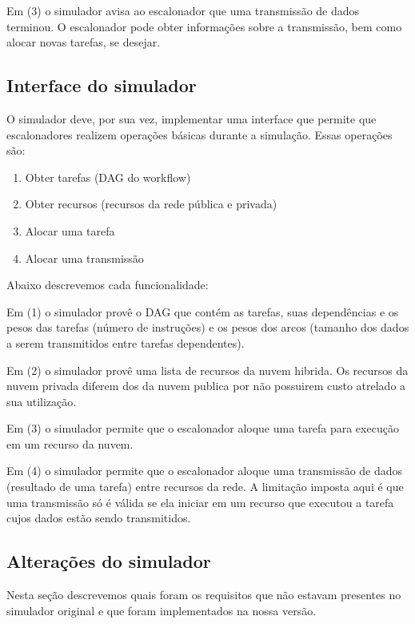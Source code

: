 \documentclass[a4paper,10pt]{article}
\begin{document}
Em (3) o simulador avisa ao escalonador que uma transmissão de dados terminou.
O escalonador pode obter informações sobre a transmissão, bem como alocar novas tarefas, se desejar.

\subsection{Interface do simulador}

O simulador deve, por sua vez, implementar uma interface que permite que escalonadores
realizem operações básicas durante a simulação. Essas operações são:

\begin{enumerate}

  \item Obter tarefas (DAG do workflow)
  \item Obter recursos (recursos da rede pública e privada)
  \item Alocar uma tarefa
  \item Alocar uma transmissão

\end{enumerate}

Abaixo descrevemos cada funcionalidade:

Em (1) o simulador provê o DAG que contém as tarefas, suas dependências e os pesos das tarefas (número
de instruções) e os pesos dos arcos (tamanho dos dados a serem transmitidos entre tarefas dependentes).

Em (2) o simulador provê uma lista de recursos da nuvem hibrida. Os recursos da nuvem privada diferem
dos da nuvem publica por não possuirem custo atrelado a sua utilização.

Em (3) o simulador permite que o escalonador aloque uma tarefa para execução em um recurso da nuvem.

Em (4) o simulador permite que o escalonador aloque uma transmissão de dados (resultado de uma tarefa)
entre recursos da rede. A limitação imposta aqui é que uma transmissão só é válida se ela iniciar em um
recurso que executou a tarefa cujos dados estão sendo transmitidos.

\subsection{Alterações do simulador}

Nesta seção descrevemos quais foram os requisitos que não estavam presentes no simulador original
e que foram implementados na nossa versão.
\end{document}
